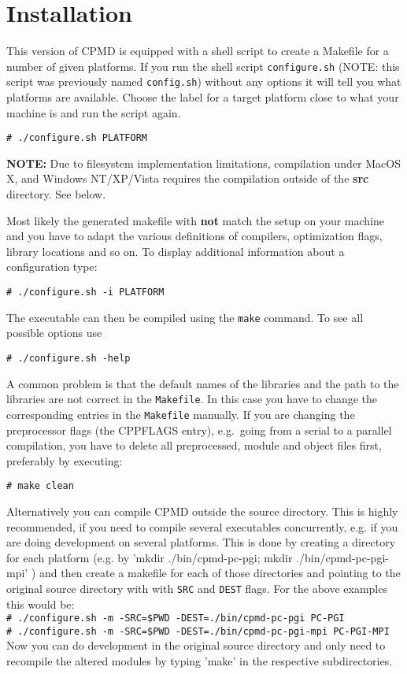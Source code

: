 \documentclass[twoside,10pt,titlepage,a4paper]{article}
\newcommand{\shellcommand}[1]{%
  \vspace*{3mm}
  \noindent
  \texttt{\# #1}
  \vspace*{3mm}
}
\begin{document}
\clearpage
\section{Installation}\label{installation}
%
This version of CPMD is equipped with a shell script to create 
a Makefile for a number of given platforms. If you run the shell 
script \texttt{configure.sh} (NOTE: this script was previously
named \texttt{config.sh}) without any options it will tell you 
what platforms are available. Choose the label for a target 
platform close to what your machine is and run the script again.

\shellcommand{./configure.sh PLATFORM }

\textbf{NOTE:} Due to filesystem implementation limitations,
compilation under MacOS X, and Windows NT/XP/Vista requires the
compilation outside of the \textbf{src} directory. See below.

Most likely the generated makefile with \textbf{not} match the
setup on your machine and you have to adapt the various definitions 
of compilers, optimization flags, library locations and so on.
To display additional information about a configuration type:

\shellcommand{./configure.sh -i PLATFORM}

The executable can then be compiled using the \texttt{make} command. 
To see all possible options use

\shellcommand{./configure.sh -help}

A common problem is that the default names of the libraries and the path to
the libraries are not correct in the \texttt{Makefile}. In this case you
have to change the corresponding entries in the \texttt{Makefile} manually.
If you are changing the preprocessor flags (the CPPFLAGS entry), 
e.g.\ going from a serial to a parallel compilation, you have to delete 
all preprocessed, module and object files first, preferably by executing:

\shellcommand{make clean}

\vspace{3mm}
  Alternatively you can compile CPMD outside the source directory.
  This is highly recommended, if you need to compile several executables
  concurrently, e.g. if you are doing development on several platforms.
  This is done by creating a directory for each platform
  (e.g. by 'mkdir ./bin/cpmd-pc-pgi; mkdir ./bin/cpmd-pc-pgi-mpi'  ) and then
  create a makefile for each of those directories and pointing to the
  original source directory with with \texttt{SRC} and \texttt{DEST}
  flags. For the above examples this would be:\\
\shellcommand{./configure.sh -m -SRC=\$PWD -DEST=./bin/cpmd-pc-pgi PC-PGI}\\
\shellcommand{./configure.sh -m -SRC=\$PWD -DEST=./bin/cpmd-pc-pgi-mpi  PC-PGI-MPI}\\
  Now you can do development in the original source directory and only
  need to recompile the altered modules by typing 'make' in the
  respective subdirectories.
\end{document}
